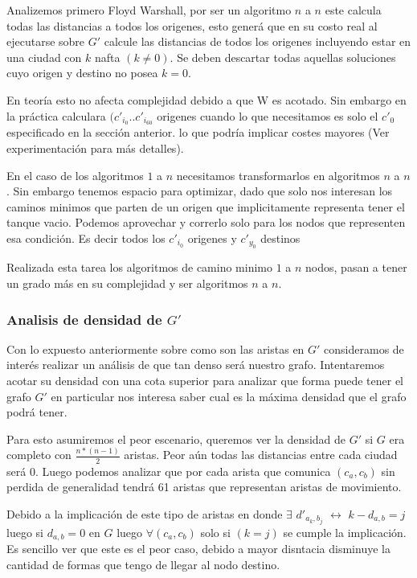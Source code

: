 \documentclass[12pt]{article}
\begin{document}
Analizemos primero Floyd Warshall, por ser un algoritmo $n$ a $n$ este calcula todas las distancias a todos los origenes, esto generá que en su costo real al ejecutarse sobre $G'$ calcule las distancias de todos los origenes incluyendo estar en una ciudad con $k$ nafta $(k \neq 0)$. Se deben descartar todas aquellas soluciones cuyo origen y destino no posea $k = 0$. 

En teoría esto no afecta complejidad debido a que W es acotado. Sin embargo en la práctica calculara $(c'_{i_0}..c'_{i_{60}}$ origenes cuando lo que necesitamos es solo el $c'_0$ especificado en la sección anterior. lo que podría implicar costes mayores (Ver experimentación para más detalles).

En el caso de los algoritmos $1$ a $n$ necesitamos transformarlos en algoritmos $n$ a $n$. Sin embargo tenemos espacio para optimizar, dado que solo nos interesan los caminos minimos que parten de un origen que implicitamente representa tener el tanque vacio. Podemos aprovechar y correrlo solo para los nodos que representen esa condición. Es decir todos los $c'_{i_0}$ origenes y $c'_{y_0}$ destinos

Realizada esta tarea los algoritmos de camino minimo $1$ a $n$ nodos, pasan a tener un grado más en su complejidad y ser algoritmos $n$ a $n$.

\subsubsection{Analisis de densidad de $G'$}

Con lo expuesto anteriormente sobre como son las aristas en $G'$ consideramos de interés realizar un análisis de que tan denso será nuestro grafo. Intentaremos acotar su densidad con una cota superior para analizar que forma puede tener el grafo $G'$ en particular nos interesa saber cual es la máxima densidad que el grafo podrá tener.

Para esto asumiremos el peor escenario, queremos ver la densidad de $G'$ si $G$ era completo con $\frac{n*(n - 1)}{2}$ aristas. Peor aún todas las distancias entre cada ciudad será 0. Luego podemos analizar que por cada arista que comunica $(c_a,c_b)$ sin perdida de generalidad tendrá 61 aristas que representan aristas de movimiento. 

Debido a la implicación de este tipo de aristas en donde $\exists$ $d'_{a_k,b_j}$ $\leftrightarrow$  $k - d_{a,b} = j$ luego si $d_{a,b} = 0$ en $G$ luego $\forall (c_a, c_b)$ solo si $(k = j)$ se cumple la implicación. Es sencillo ver que este es el peor caso, debido a mayor disntacia disminuye la cantidad de formas que tengo de llegar al nodo destino.
\end{document}
